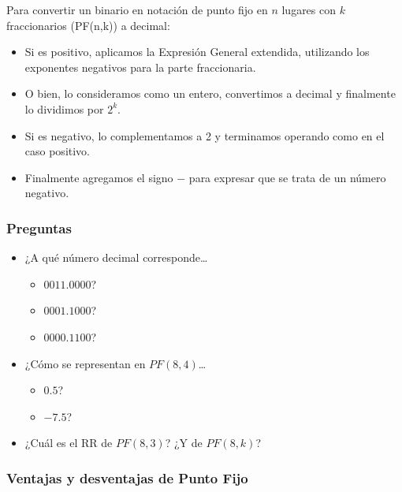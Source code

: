\documentclass[spanish,A4,]{article}
\begin{document}
Para convertir un binario en notación de punto fijo en $n$ lugares con
$k$ fraccionarios (PF(n,k)) a decimal:

\begin{itemize}
\itemsep1pt\parskip0pt
\item
  Si es positivo, aplicamos la Expresión General extendida, utilizando
  los exponentes negativos para la parte fraccionaria.
\item
  O bien, lo consideramos como un entero, convertimos a decimal y
  finalmente lo dividimos por $2^k$.
\item
  Si es negativo, lo complementamos a 2 y terminamos operando como en el
  caso positivo.
\item
  Finalmente agregamos el signo $-$ para expresar que se trata de un
  número negativo.
\end{itemize}

\subsubsection{Preguntas}\label{preguntas}

\begin{itemize}
\itemsep1pt\parskip0pt
\item
  ¿A qué número decimal corresponde\ldots{}

  \begin{itemize}
  \itemsep1pt\parskip0pt
  \item
    $0011.0000$?
  \item
    $0001.1000$?
  \item
    $0000.1100$?
  \end{itemize}
\item
  ¿Cómo se representan en $PF(8,4)$\ldots{}

  \begin{itemize}
  \itemsep1pt\parskip0pt
  \item
    $0.5$?
  \item
    $-7.5$?
  \end{itemize}
\item
  ¿Cuál es el RR de $PF(8,3)$? ¿Y de $PF(8,k)$?
\end{itemize}

\subsubsection{Ventajas y desventajas de Punto
Fijo}\label{ventajas-y-desventajas-de-punto-fijo}
\end{document}
